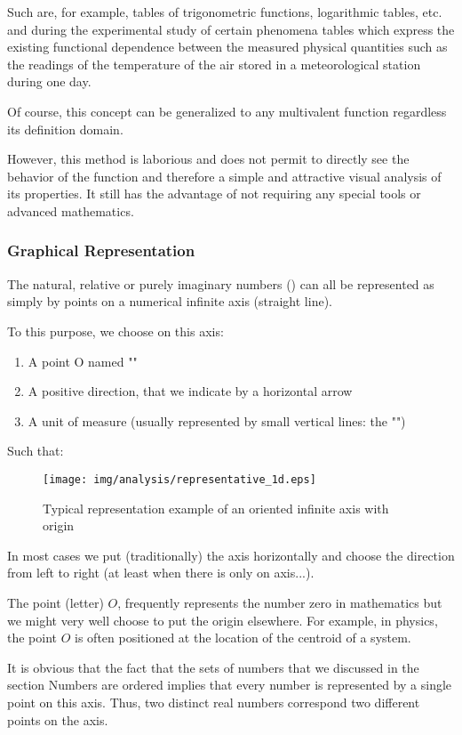 Such are, for example, tables of trigonometric functions, logarithmic tables, etc. and during the experimental study of certain phenomena tables which express the existing functional dependence between the measured physical quantities such as the readings of the temperature of the air stored in a meteorological station during one day.

Of course, this concept can be generalized to any multivalent function regardless its definition domain.

However, this method is laborious and does not permit to directly see the behavior of the function and therefore a simple and attractive visual analysis of its properties. It still has the advantage of not requiring any special tools or advanced mathematics.

	\pagebreak
	\subsubsection{Graphical Representation}

The natural, relative or purely imaginary numbers () can all be represented as simply by points on a numerical infinite axis (straight line).

To this purpose, we choose on this axis:
	\begin{enumerate}
		\item A point O named ""
		\item A positive direction, that we indicate by a horizontal arrow
		\item A unit of measure (usually represented by small vertical lines: the "")
	\end{enumerate}
Such that:
\begin{figure}[H]
\centering
\texttt{[image: img/analysis/representative\_1d.eps]}
\caption{Typical representation example of an oriented infinite axis with origin}
\end{figure}
In most cases we put (traditionally) the axis horizontally and choose the direction from left to right (at least when there is only on axis...).
	\begin{tcolorbox}[title=Remark,colframe=black,arc=10pt]
The point (letter) $O$, frequently represents the number zero in mathematics but we might very well choose to put the origin elsewhere. For example, in physics, the point $O$ is often positioned at the location of the centroid of a system. 
	\end{tcolorbox}
It is obvious that the fact that the sets of numbers that we discussed in the section Numbers are ordered implies that every number is represented by a single point on this axis. Thus, two distinct real numbers correspond two different points on the axis.

